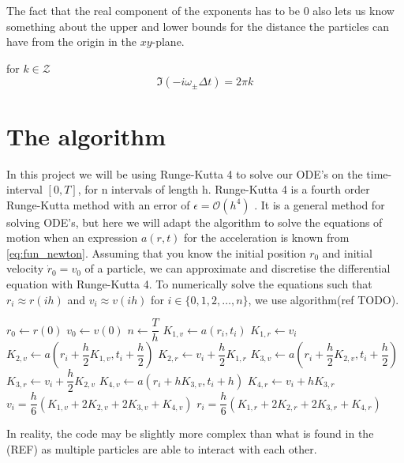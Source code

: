 The fact that the real component of the exponents has to be $0$ also lets us know something about the upper and lower bounds for the distance the particles can have from the origin in the $xy$-plane. 

for $k \in \mathcal{Z}$
$$\Im(-i \omega_\pm \Delta t) = 2 \pi k$$

\section*{The algorithm}
In this project we will be using Runge-Kutta 4 to solve our ODE's on the time-interval $[0, T]$, for n intervals of length h. Runge-Kutta 4 is a fourth order Runge-Kutta method with an error of $\epsilon = \mathcal{O}(h^4)$ . It is a general method for solving ODE's, but here we will adapt the algorithm to solve the equations of motion when an expression $a(r, t)$ for the acceleration is known from \ref{eq:fun_newton}. Assuming that you know the initial position $r_0$ and initial velocity $\dot{r}_0=v_0$ of a particle, we can approximate and discretise the differential equation with Runge-Kutta 4. To numerically solve the equations such that $r_i \approx r(ih)$ and $v_i \approx v(ih)$ for $i \in \{0, 1, 2, \ldots, n\}$, we use algorithm(ref TODO).
\begin{algorithmic}
	\State $r_0 \gets r(0)$
	\State $v_0 \gets v(0)$
	\State $n \gets \dfrac{T}{h}$
		\State $K_{1,v} \gets a(r_i, t_i)$
		\State $K_{1,r} \gets v_i$
		\State $K_{2,v} \gets a(r_i + \dfrac{h}{2}K_{1,v}, t_i + \dfrac{h}{2})$
		\State $K_{2,r} \gets v_i + \dfrac{h}{2} K_{1,r}$
		\State $K_{3,v} \gets a(r_i + \dfrac{h}{2}K_{2,v}, t_i + \dfrac{h}{2})$
		\State $K_{3,r} \gets v_i + \dfrac{h}{2} K_{2,v}$
		\State $K_{4, v} \gets a(r_i + hK_{3,v}, t_i+h)$
		\State $K_{4, r} \gets v_i + hK_{3,r}$
		\State $v_i = \dfrac{h}{6}(K_{1,v} + 2K_{2,v} + 2K_{3,v} + K_{4,v})$
		\State $r_i = \dfrac{h}{6}(K_{1,r} + 2K_{2,r} + 2K_{3,r} + K_{4,r})$
	\EndFor
\end{algorithmic}
In reality, the code may be slightly more complex than what is found in the (REF) as multiple particles are able to interact with each other.
